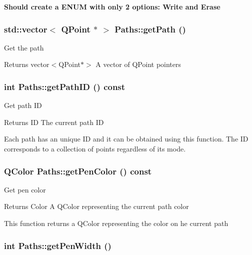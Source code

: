 {\bfseries Should create a ENUM with only 2 options: Write and Erase} \hypertarget{classPaths_a4ac5bea87220875022abb6cdbb3b00f4}{
\subsubsection[{getPath}]{\setlength{\rightskip}{0pt plus 5cm}std::vector$<$ QPoint $\ast$ $>$ Paths::getPath ()}}
\label{classPaths_a4ac5bea87220875022abb6cdbb3b00f4}
Get the path \begin{DoxyReturn}{Returns}
vector$<$QPoint$\ast$$>$ A vector of QPoint pointers 
\end{DoxyReturn}
\hypertarget{classPaths_a5203e25740ac9ed49429df9937e09be0}{
\subsubsection[{getPathID}]{\setlength{\rightskip}{0pt plus 5cm}int Paths::getPathID () const}}
\label{classPaths_a5203e25740ac9ed49429df9937e09be0}
Get path ID \begin{DoxyReturn}{Returns}
ID The current path ID
\end{DoxyReturn}
Each path has an unique ID and it can be obtained using this function. The ID corresponds to a collection of points regardless of its mode. \hypertarget{classPaths_a585370c009c5039487023dd034da4649}{
\subsubsection[{getPenColor}]{\setlength{\rightskip}{0pt plus 5cm}QColor Paths::getPenColor () const}}
\label{classPaths_a585370c009c5039487023dd034da4649}
Get pen color \begin{DoxyReturn}{Returns}
Color A QColor representing the current path color
\end{DoxyReturn}
This function returns a QColor representing the color on he current path \hypertarget{classPaths_a3cd98da812b83627277d7ecdd236e0d8}{
\subsubsection[{getPenWidth}]{\setlength{\rightskip}{0pt plus 5cm}int Paths::getPenWidth ()}}
